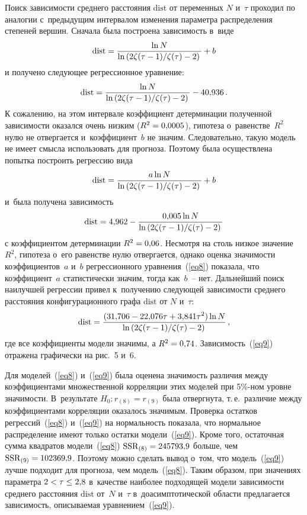 \begin{multicols}{2}
Поиск зависимости среднего расстояния $\mathrm{dist}$ от переменных $N$ и~$\tau$ 
проходил по аналогии с~предыду\-щим интервалом изменения параметра распределения степеней вершин.
Сначала была по\-стро\-ена за\-ви\-си\-мость в~виде 
$$
\mathrm{dist}=\displaystyle\frac{\displaystyle \ln N\mathstrut}{\displaystyle \ln\left({2\zeta(\tau-1)}/{\zeta(\tau)}-2\right)\mathstrut}+b
$$
и получено сле\-ду\-ющее регрессионное уравнение:
\begin{equation*}
\mathrm{dist} = \displaystyle\frac{\displaystyle \ln N\mathstrut}{\displaystyle \ln\left({2\zeta(\tau-1)}/{\zeta(\tau)}-2\right)\mathstrut}-40{,}936\,.
\end{equation*}
К сожалению, на этом интервале коэффициент детерминации полученной за\-ви\-си\-мости оказался очень низким
($R^2\hm=0{,}0005$), гипотеза о~равенстве~$R^2$ нулю не отвергается и~коэффициент~$b$ не значим.
Следовательно, такую модель не имеет смыс\-ла использовать для прогноза.
Поэтому была осуществлена попытка по\-стро\-ить регрессию вида
$$
\mathrm{dist}=\displaystyle\frac{\displaystyle a\ln N\mathstrut}{\displaystyle \ln\left({2\zeta(\tau-1)}/{\zeta(\tau)}-2\right)\mathstrut}+b
$$ 
и~была получена зависимость
\begin{equation}
\label{eq8}
\mathrm{dist} = 4{,}962 - \displaystyle\frac{\displaystyle 0{,}005\ln N\mathstrut}{\displaystyle \ln\left({2\zeta(\tau-1)}/{\zeta(\tau)}-2\right)\mathstrut}
\end{equation}
с коэффициентом детерминации $R^2\hm=0{,}06$. Несмотря на столь низ\-кое значение~$R^2$, гипотеза о~его
равенстве нулю отвергается, однако оценка зна\-чи\-мости коэффициентов~$a$ и~$b$
регрессионного уравнения~(\ref{eq8}) показала, что коэффициент~$a$ статистически значим, тогда как~$b$~-- нет.
Дальнейший поиск наилучшей регрессии привел к~получению сле\-ду\-ющей за\-ви\-си\-мости
сред\-не\-го рас\-сто\-яния конфигурационного графа $\mathrm{dist}$ от $N$ и~$\tau$:
\begin{equation}
\label{eq9}
\mathrm{dist} = \displaystyle\frac{\displaystyle (31{,}706-22{,}076\tau+3{,}841\tau^2)\ln N\mathstrut}{\displaystyle \ln\left({2\zeta(\tau-1)}/{\zeta(\tau)}-2\right)\mathstrut}\,,
\end{equation}
где все коэффициенты модели значимы, а $R^2\hm=0{,}74$. Зависимость~(\ref{eq9}) отражена графически на рис.~5 и~6.

Для моделей~(\ref{eq8}) и~(\ref{eq9}) была оценена зна\-чи\-мость различия между коэффициентами множественной
корреляции этих моделей при 5\%-ном уровне зна\-чи\-мости. В~результате $H_0:r_{(8)}=r_{(9)}$ была отвергнута, т.\,е.\
различие между коэффициентами корреляции оказалось значимым.
Проверка остатков регрессий~(\ref{eq8}) и~(\ref{eq9}) на нормальность показала, что нормальное распределение
имеют только остатки модели~(\ref{eq9}). Кроме того, остаточная сумма квад\-ра\-тов модели~(\ref{eq8})
$\mathrm{SSR}_{(8)}\hm=245793{,}9$ больше, чем $\mathrm{SSR}_{(9)}\hm=102369{,}9$. Поэтому мож\-но сделать вывод о~том, что модель~(\ref{eq9})
лучше подходит для прогноза, чем модель~(\ref{eq8}).
Таким образом, при значениях па\-ра\-мет\-ра $2\hm<\tau\hm\leq 2{,}8$ в~качестве наиболее подходящей модели за\-ви\-си\-мости
среднего рас\-сто\-яния $\mathrm{dist}$ от~$N$ и~$\tau$ в~до\-асимп\-то\-ти\-че\-ской об\-ласти предлагается за\-ви\-си\-мость, опи\-сы\-ва\-емая
уравнением~(\ref{eq9}).




\end{multicols}
